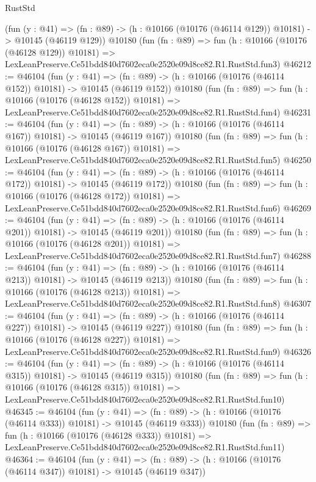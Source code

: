 \begin{lexlean}{RustStd}
\begin{coremodule}
    (fun (y : @41) =>
    (fn : @89) -> (h : @10166 (@10176 (@46114 @129)) @10181) -> @10145 (@46119 @129))
    @10180
    (fun (fn : @89) =>
    fun (h : @10166 (@10176 (@46128 @129)) @10181) =>
    LexLeanPreserve.Ce51bdd840d7602eca0e2520e09d8ce82.R1.RustStd.fun3)
@46212 := @46104
    (fun (y : @41) =>
    (fn : @89) -> (h : @10166 (@10176 (@46114 @152)) @10181) -> @10145 (@46119 @152))
    @10180
    (fun (fn : @89) =>
    fun (h : @10166 (@10176 (@46128 @152)) @10181) =>
    LexLeanPreserve.Ce51bdd840d7602eca0e2520e09d8ce82.R1.RustStd.fun4)
@46231 := @46104
    (fun (y : @41) =>
    (fn : @89) -> (h : @10166 (@10176 (@46114 @167)) @10181) -> @10145 (@46119 @167))
    @10180
    (fun (fn : @89) =>
    fun (h : @10166 (@10176 (@46128 @167)) @10181) =>
    LexLeanPreserve.Ce51bdd840d7602eca0e2520e09d8ce82.R1.RustStd.fun5)
@46250 := @46104
    (fun (y : @41) =>
    (fn : @89) -> (h : @10166 (@10176 (@46114 @172)) @10181) -> @10145 (@46119 @172))
    @10180
    (fun (fn : @89) =>
    fun (h : @10166 (@10176 (@46128 @172)) @10181) =>
    LexLeanPreserve.Ce51bdd840d7602eca0e2520e09d8ce82.R1.RustStd.fun6)
@46269 := @46104
    (fun (y : @41) =>
    (fn : @89) -> (h : @10166 (@10176 (@46114 @201)) @10181) -> @10145 (@46119 @201))
    @10180
    (fun (fn : @89) =>
    fun (h : @10166 (@10176 (@46128 @201)) @10181) =>
    LexLeanPreserve.Ce51bdd840d7602eca0e2520e09d8ce82.R1.RustStd.fun7)
@46288 := @46104
    (fun (y : @41) =>
    (fn : @89) -> (h : @10166 (@10176 (@46114 @213)) @10181) -> @10145 (@46119 @213))
    @10180
    (fun (fn : @89) =>
    fun (h : @10166 (@10176 (@46128 @213)) @10181) =>
    LexLeanPreserve.Ce51bdd840d7602eca0e2520e09d8ce82.R1.RustStd.fun8)
@46307 := @46104
    (fun (y : @41) =>
    (fn : @89) -> (h : @10166 (@10176 (@46114 @227)) @10181) -> @10145 (@46119 @227))
    @10180
    (fun (fn : @89) =>
    fun (h : @10166 (@10176 (@46128 @227)) @10181) =>
    LexLeanPreserve.Ce51bdd840d7602eca0e2520e09d8ce82.R1.RustStd.fun9)
@46326 := @46104
    (fun (y : @41) =>
    (fn : @89) -> (h : @10166 (@10176 (@46114 @315)) @10181) -> @10145 (@46119 @315))
    @10180
    (fun (fn : @89) =>
    fun (h : @10166 (@10176 (@46128 @315)) @10181) =>
    LexLeanPreserve.Ce51bdd840d7602eca0e2520e09d8ce82.R1.RustStd.fun10)
@46345 := @46104
    (fun (y : @41) =>
    (fn : @89) -> (h : @10166 (@10176 (@46114 @333)) @10181) -> @10145 (@46119 @333))
    @10180
    (fun (fn : @89) =>
    fun (h : @10166 (@10176 (@46128 @333)) @10181) =>
    LexLeanPreserve.Ce51bdd840d7602eca0e2520e09d8ce82.R1.RustStd.fun11)
@46364 := @46104
    (fun (y : @41) =>
    (fn : @89) -> (h : @10166 (@10176 (@46114 @347)) @10181) -> @10145 (@46119 @347))

\end{coremodule}
\end{lexlean}
